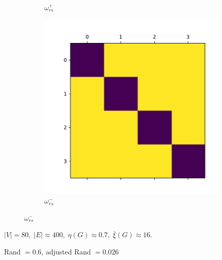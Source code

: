 \documentclass{beamer}
\begin{document}
\begin{frame}[c]
\begin{figure}
\begin{center}
\begin{subfigure}[b]{0.3\textwidth}
				\caption{$\omega ^{+} _{rs} $}
				\label{fig:out/synthetic/omega_positive1.pdf}
			\end{subfigure}
			\begin{subfigure}[b]{0.3\textwidth}
				\centering
				\includegraphics[width=\textwidth]{out/synthetic/model2_omega_negative2.pdf}
				\caption{$\omega ^{-} _{rs} $}
				\label{fig:}
			\end{subfigure}
		\end{center}
	\end{figure}

	$|V| = 80, \; |E| \approx 400, \; \eta(G) \approx 0.7, \; \bar{\xi}(G)
		\approx 16$.

	Rand $= 0.6$, adjusted Rand $= 0.026$
\end{frame}
\end{document}
